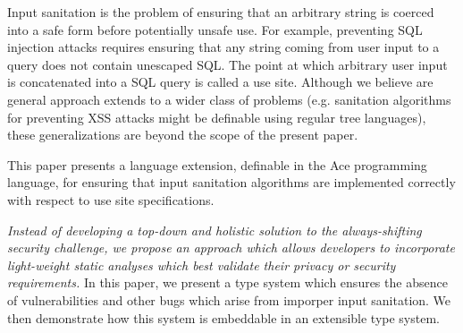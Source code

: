 \documentclass{acm_proc_article-sp}
\theoremstyle{definition}
\begin{document}
Input sanitation is the problem of ensuring that an arbitrary string
is coerced into a safe form before potentially unsafe use. For example, 
preventing SQL injection attacks requires ensuring that any string
coming from user input to a query does not contain unescaped SQL. 
The point at which arbitrary user input is concatenated into a SQL query is called a use site.
Although we believe are general approach extends to a wider class of problems
(e.g. sanitation algorithms for preventing XSS attacks might be definable using
regular tree languages), these generalizations are beyond the scope of the 
present paper.



%


This paper presents a language extension, definable in the Ace programming language,
for ensuring that input sanitation algorithms are implemented correctly with
respect to use site specifications. 

\emph{Instead of developing a top-down and holistic solution to the always-shifting security challenge,
we propose an approach which allows developers to incorporate light-weight static
analyses which best validate their privacy or security requirements.}
In this paper, we present a type system which ensures the absence of vulnerabilities and other bugs
which arise from imporper input sanitation.
We then demonstrate how this system is embeddable in an extensible type system.
\end{document}

